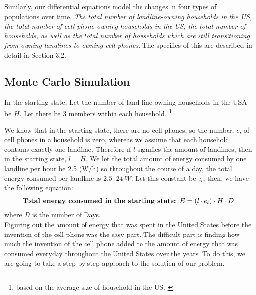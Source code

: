 \documentclass{article}
\begin{document}
Similarly, our differential equations model the changes in four types of populations over time, \textit{The total number of landline-owning households in the US, the total number of cell-phone-owning households in the US, the total number of households, as well as the total number of households which are still transitioning from owning landlines to owning cell-phones}. The specifics of this are described in detail in Section 3.2. \par

\subsection{Monte Carlo Simulation}
In the starting state, Let the number of land-line owning households in the USA be $H$. Let  there be 3  members  within each household. \footnote{based on the average size of household in the US. \cite{Households}}    \par
We know that in the starting state, there are no cell phones, so the number, $c$, of cell phones in a household is zero, whereas we assume that each household contains exactly one landline. Therefore if $l$ signifies the amount of landlines, then in the starting state, $l = H$. We let the total amount of energy consumed by one landline per hour be 2.5 (W/h) \cite{chargerData} so throughout the course of a day, the total energy consumed per landline is $2.5 \cdot 24~ W$. Let this constant be $e_l$, then, we have the following equation:
$$ \text{\textbf{Total energy consumed in the starting state: }} E = (l \cdot e_l) \cdot H \cdot D$$ where $D$ is the number of Days.\\

Figuring out the amount of energy that was spent in the United States before the invention of the cell phone was the easy part. The difficult part is finding how much  the invention of the cell phone added to the amount of energy that was consumed everyday throughout the United States over the years. To do this, we are going to take a step by step approach to the solution of our problem.
\end{document}
